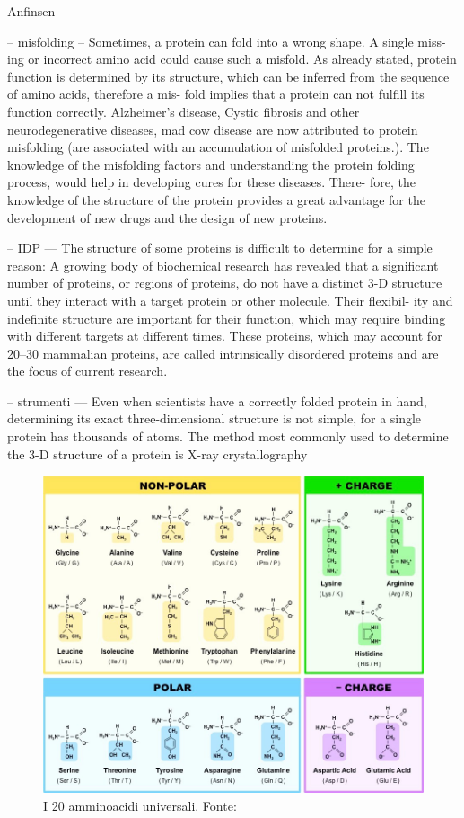 Anfinsen \supercite{anfinsen1972formation}

-- misfolding --
Sometimes, a protein can fold into a wrong shape. A single miss-
ing or incorrect amino acid could cause such a misfold. As already
stated, protein function is determined by its structure, which can
be inferred from the sequence of amino acids, therefore a mis-
fold implies that a protein can not fulfill its function correctly.
Alzheimer’s disease, Cystic fibrosis and other neurodegenerative
diseases, mad cow disease are now attributed to protein misfolding (are associated with an accumulation
of misfolded proteins.). The knowledge
of the misfolding factors and understanding the protein folding
process, would help in developing cures for these diseases. There-
fore, the knowledge of the structure of the protein provides a great
advantage for the development of new drugs and the design of new
proteins.

-- IDP ---
The structure of some proteins is difficult to determine
for a simple reason: A growing body of biochemical research
has revealed that a significant number of proteins, or regions
of proteins, do not have a distinct 3-D structure until they
interact with a target protein or other molecule. Their flexibil-
ity and indefinite structure are important for their function,
which may require binding with different targets at different
times. These proteins, which may account for 20–30%
mammalian proteins, are called intrinsically disordered proteins
and are the focus of current research.


-- strumenti ---
Even when scientists have a correctly folded protein in
hand, determining its exact three-dimensional structure is
not simple, for a single protein has thousands of atoms. The
method most commonly used to determine the 3-D structure
of a protein is X-ray crystallography

\begin{figure}[h]
	\centering
	\includegraphics[scale=0.4]{images/aminoacid-tipi.jpeg}
	\caption{I 20 amminoacidi universali. Fonte: \cite{aminoacidTipi}}
	\label{fig:amminoacidi-tipi}
\end{figure}

\clearpage